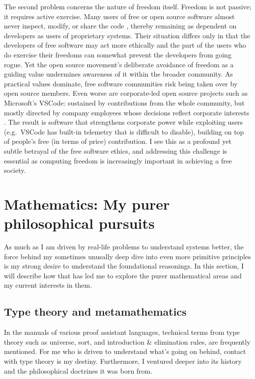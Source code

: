 \documentclass[10pt]{article}
\begin{document}
The second problem concerns the nature of freedom itself. Freedom is not
passive; it requires active exercise. Many users of free or open source
software almost never inspect, modify, or share the code
\cite{open.source.contrib}, thereby remaining as dependent on developers as
users of proprietary systems. Their situation differs only in that the
developers of free software may act more ethically and the part of the users
who do exercise their freedoms can somewhat prevent the developers from going
rogue. Yet the open source movement's deliberate avoidance of freedom as a
guiding value undermines awareness of it within the broader community. As
practical values dominate, free software communities risk being taken over by
open source members. Even worse are corporate-led open source projects such as
Microsoft’s VSCode: sustained by contributions from the whole community, but
mostly directed by company employees whose decisions reflect corporate
interests \cite{corporate.open.source, fake.open.source}. The result is
software that strengthens corporate power while exploiting users (e.g.\ VSCode
has built-in telemetry that is difficult to disable), building on top of
people's free (in terms of price) contribution. I see this as a profound yet
subtle betrayal of the free software ethics, and addressing this challenge is
essential as computing freedom is increasingly important in achieving a free
society.


\section[Mathematics]{Mathematics: My purer philosophical pursuits}
\label{sec.math}
As much as I am driven by real-life problems to understand systems better, the
force behind my sometimes unusally deep dive into even more primitive
principles is my strong desire to understand the foundational reasonings. In
this section, I will describe how that has led me to explore the purer
mathematical areas and my current interests in them.

\subsection{Type theory and metamathematics}
In the manuals of various proof assistant languages, technical terms from type
theory such as universe, sort, and introduction \& elimination rules, are
frequently mentioned. For me who is driven to understand what's going on
behind, contact with type theory is my destiny. Furthermore, I ventured deeper
into its history and the philosophical doctrines it was born from.
\end{document}
